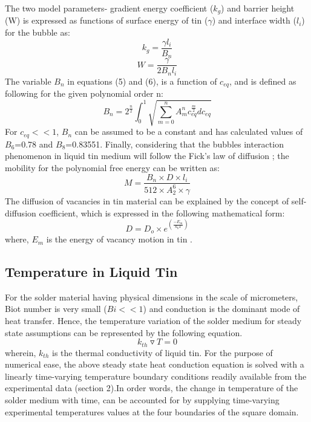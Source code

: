 \documentclass[10pt,a4paper]{article}
\begin{document}
The two model parameters- gradient energy coefficient ($k_{g}$) and barrier height (W) is expressed as functions of surface energy of tin ($\gamma$) and interface width ($l_i$) for the bubble as:
\begin{equation}
k_{g} = \frac{\gamma l_i}{B_n}
\end{equation} 
\begin{equation}
W = \frac{\gamma}{2B_{n}l_i}
\end{equation}
The variable $B_n$ in equations (5) and (6), is a function of $c_{eq}$, and is defined as following for the given polynomial order n:
\begin{equation}
B_n =2^{\frac{n}{2}} \int _{0} ^{1} \sqrt{\sum _{m=0} ^{n} A _{m} ^{n} c _{eq} ^{\frac{m}{2}} dc_{eq}}
\end{equation} 
For $c_{eq} << 1$, $B_n$ can be assumed to be a constant and has calculated values of $B_{6}$=0.78 and $B_{8}$=0.83551.
Finally, considering that the bubbles interaction phenomenon in liquid tin medium will follow the Fick's law of diffusion \cite{10}; the mobility for the polynomial free energy can be written as:
\begin{equation}
M = \frac{B_{n} \times D \times l_i}{512 \times A _{2} ^{6} \times \gamma}
\end{equation}
The diffusion of vacancies in tin material can be explained by the concept of self-diffusion coefficient, which is expressed in the following mathematical form:
\begin{equation}
D = D_{o} \times e ^{(\frac{-E_{m}}{k_{b}T})}
\end{equation}
where, $E_m$ is the energy of vacancy motion in tin \cite{10}.

\subsection{Temperature in Liquid Tin}
For the solder material having physical dimensions in the scale of micrometers, Biot number is very small ($Bi << 1$) and conduction is the dominant mode of heat transfer. Hence, the temperature variation of the solder medium for steady state assumptions can be represented by the following equation.
\begin{equation}
k_{th} \triangledown T = 0
\end{equation}
wherein, $k_{th}$ is the thermal conductivity of liquid tin.
For the purpose of numerical ease, the above steady state heat conduction equation is solved with a linearly time-varying temperature boundary conditions readily available from the experimental data (section 2).In order words, the change in temperature of the solder medium with time, can be accounted for by supplying time-varying experimental temperatures values  at the four boundaries of the square domain. 
 
\end{document}
